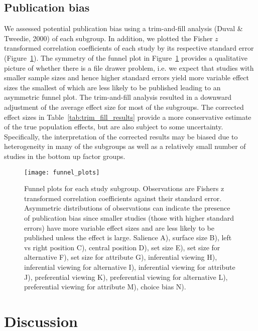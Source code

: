 \documentclass{article}
\begin{document}
\subsection{Publication bias}

We assessed potential publication bias using a trim-and-fill analysis (Duval \& Tweedie, 2000) of each subgroup. In addition, we plotted the Fisher $z$ transformed correlation coefficients of each study by its respective standard error (Figure~\ref{fig:funnel_plots}). The symmetry of the funnel plot in Figure~\ref{fig:funnel_plots} provides a qualitative picture of whether there is a file drawer problem, i.e. we expect that studies with smaller sample sizes and hence higher standard errors yield more variable effect sizes the smallest of which are less likely to be published leading to an asymmetric funnel plot. The trim-and-fill analysis resulted in a downward adjustment of the average effect size for most of the subgroups. The corrected effect sizes in Table~\ref{tab:trim_fill_results} provide a more conservative estimate of the true population effects, but are also subject to some uncertainty. Specifically, the interpretation of the corrected results may be biased due to heterogeneity in many of the subgroups as well as a relatively small number of studies in the bottom up factor groups.


\begin{figure}%
\texttt{[image: funnel\_plots]}
\centering
\caption{Funnel plots for each study subgroup. Observations are Fishers z transformed correlation coefficients against their standard error. Asymmetric distributions of observations can indicate the presence of publication bias since smaller studies (those with higher standard errors) have more variable effect sizes and are less likely to be published unless the effect is large. Salience A), surface size B), left vs right position C), central position D), set size E), set size for alternative F), set size for attribute G), inferential viewing H), inferential viewing for alternative I), inferential viewing for attribute J), preferential viewing K), preferential viewing for alternative L), preferential viewing for attribute M), choice bias N).}
\label{fig:funnel_plots}
\end{figure}



\section{Discussion}
\end{document}
